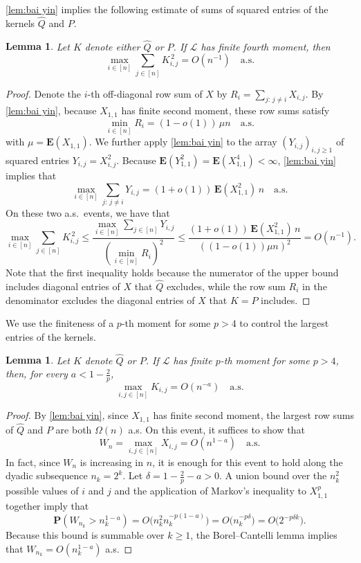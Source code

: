 \documentclass[12pt]{amsart}
\newcommand\wh[1]{\widehat{#1}}
\newtheorem{lemma}[theorem]{Lemma}
\renewcommand{\P}{\mathbf{P}}
\newcommand{\E}{\mathbf{E}}
\DeclareMathOperator{\1}{\mathbf{1}}
\begin{document}
\cref{lem:bai yin} implies the following estimate of sums of squared entries of the kernels $\wh{Q}$ and $P$.

\begin{lemma}\label{lem:l2 control}
Let $K$ denote either $\wh{Q}$ or $P$. If $\mathcal{L}$ has finite fourth moment, then
\[
	\max_{i \in [n]} \sum_{j \in [n]} K_{i,j}^{\,2} = O(n^{-1}) \quad \mathrm{a.s.}
\]
\end{lemma}

\begin{proof}
Denote the $i$-th off-diagonal row sum of $X$ by $R_i = \sum_{j: \, j \neq i} X_{i,j}$. By \cref{lem:bai yin}, because $X_{1,1}$ has finite second moment, these row sums satisfy
\[
	\min_{i \in [n]} R_i = (1- o(1))\, \mu n \quad \mathrm{a.s.}
\]
with $\mu = \E(X_{1,1})$. We further apply \cref{lem:bai yin} to the array $(Y_{i,j})_{i,j \geq 1}$ of squared entries $Y_{i,j} = X_{i,j}^2$. Because $\E (Y_{1,1}^2) = \E (X_{1,1}^4) < \infty$, \cref{lem:bai yin} implies that
\[
	\max_{i \in [n]} \sum_{j: \, j \neq i} Y_{i,j} = (1+o(1))\, \E (X_{1,1}^2)\, n \quad \mathrm{a.s.}
\]
On these two a.s.\ events, we have that
\[
	\max_{i \in [n]} \sum_{j \in [n]} K_{i,j}^{\, 2} \leq \frac{\max_{i \in [n]} \sum_{j \in [n]} Y_{i,j}}{(\min_{i \in [n]} R_i)^2} \leq \frac{(1+o(1))\, \E (X_{1,1}^2)\, n}{( (1-o(1)) \mu n )^2} = O(n^{-1}).
\]
Note that the first inequality holds because the numerator of the upper bound includes diagonal entries of $X$ that $\wh{Q}$ excludes, while the row sum $R_i$ in the denominator excludes the diagonal entries of $X$ that $K = P$ includes.
\end{proof}

We use the finiteness of a $p$-th moment for some $p > 4$ to control the largest entries of the kernels.

\begin{lemma}\label{lem:max control}
Let $K$ denote $\wh{Q}$ or $P$. If $\mathcal{L}$ has finite $p$-th moment for some $p >4$, then, for every $a < 1 - \frac{2}{p}$,
\[
	\max_{i,j \in [n]} K_{i,j} = O (n^{-a}) \quad \mathrm{a.s.}
\]
\end{lemma}

\begin{proof}
By \cref{lem:bai yin}, since $X_{1,1}$ has finite second moment, the largest row sums of $\wh{Q}$ and $P$ are both $\Omega (n)$ a.s. On this event, it suffices to show that
\[
	W_n = \max_{i,j \in [n]} X_{i,j} = O(n^{1-a}) \quad \mathrm{a.s.}
\]
In fact, since $W_n$ is increasing in $n$, it is enough for this event to hold along the dyadic subsequence $n_k = 2^k$. Let $\delta = 1 - \frac{2}{p} - a > 0$. A union bound over the $n_k^2$ possible values of $i$ and $j$ and the application of Markov's inequality to $X_{1,1}^p$ together imply that
\[
    \P (W_{n_k} > n_k^{1-a}) = O \big(n_k^2 n_k^{-p(1-a)} \big) = O \big(n_k^{-p\delta} \big) = O\big(2^{-p\delta k}\big).
\]
Because this bound is summable over $k \geq 1$, the Borel--Cantelli lemma implies that $W_{n_k} = O(n_k^{1-a})$ a.s.
\end{proof}
\end{document}
